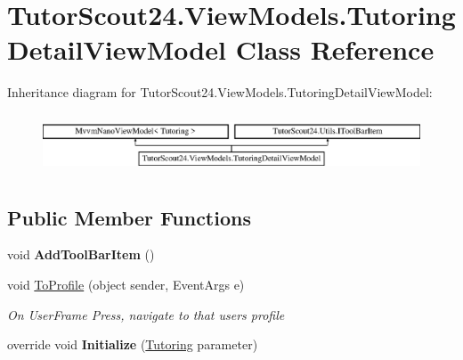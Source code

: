 \hypertarget{class_tutor_scout24_1_1_view_models_1_1_tutoring_detail_view_model}{}\section{Tutor\+Scout24.\+View\+Models.\+Tutoring\+Detail\+View\+Model Class Reference}
\label{class_tutor_scout24_1_1_view_models_1_1_tutoring_detail_view_model}
Inheritance diagram for Tutor\+Scout24.\+View\+Models.\+Tutoring\+Detail\+View\+Model\+:\begin{figure}[H]
\begin{center}
\leavevmode
\includegraphics[height=1.789137cm]{class_tutor_scout24_1_1_view_models_1_1_tutoring_detail_view_model}
\end{center}
\end{figure}
\subsection*{Public Member Functions}
\begin{DoxyCompactItemize}
\item 
\mbox{\label{class_tutor_scout24_1_1_view_models_1_1_tutoring_detail_view_model_a52d3de4e9808d1c02b29ece1cf4a9c8c}} 
void {\bfseries Add\+Tool\+Bar\+Item} ()
\item 
void \mbox{\hyperlink{class_tutor_scout24_1_1_view_models_1_1_tutoring_detail_view_model_ae8b5bb8d8ebd4cc6425f52674fddc288}{To\+Profile}} (object sender, Event\+Args e)
\begin{DoxyCompactList}\small\item\em On User\+Frame Press, navigate to that user\textquotesingle{}s profile \end{DoxyCompactList}\item 
\mbox{\label{class_tutor_scout24_1_1_view_models_1_1_tutoring_detail_view_model_ae0f655dc6153a19e6df60963abda33cb}} 
override void {\bfseries Initialize} (\mbox{\hyperlink{class_tutor_scout24_1_1_models_1_1_tutorings_1_1_tutoring}{Tutoring}} parameter)
\end{DoxyCompactItemize}
